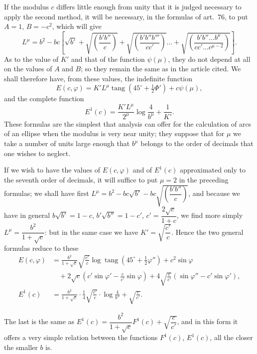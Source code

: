 \documentclass{article}
\begin{document}
If the modulus $c$ differs little enough from unity that it is judged necessary to apply the second method, it will be necessary, in the formulas of art.~76, to put $A=1$, $B=-c^{2}$, which will give
\[ L^{\mu}=b^{2}-bc\left[\sqrt{b'}+\sqrt{\left(\frac{b'b''}{c}\right)}+\sqrt{\left(\frac{b'b''b'''}{cc'}\right)}\ldots+\sqrt{\left(\frac{b'b''\ldots b^{\mu}}{cc'\ldots c^{\mu-2}}\right)}\right]. \]
As to the value of $K'$ and that of the function $\psi(\mu)$, they do not depend at all on the values of $A$ and $B$; so they remain the same as in the article cited. We shall therefore have, from these values, the indefinite function
\[ E(c,\varphi)=K'L^{\mu}\operatorname{tang}(45^{\circ}+\tfrac{1}{2}\Phi')+c\psi(\mu), \]
and the complete function
\[ E^{1}(c)=\frac{K'L^{\mu}}{2^{\mu}}\log\frac{4}{b^{\mu}}+\frac{1}{K'}. \]
These formulas are the simplest that analysis can offer for the calculation of arcs of an ellipse when the modulus is very near unity; they suppose that for $\mu$ we take a number of units large enough that $b^{\mu}$ belongs to the order of decimals that one wishes to neglect.

If we wish to have the values of $E(c,\varphi)$ and of $E^{1}(c)$ approximated only to the seventh order of decimals, it will suffice to put $\mu=2$ in the preceding formulas; we shall have first $L^{\mu}=b^{2}-bc\sqrt{b'}-bc\sqrt{\left(\dfrac{b'b''}{c}\right)}$, and because we have in general $b\sqrt{b'}=1-c$, $b'\sqrt{b''}=1-c'$, $c'=\dfrac{2\sqrt{c}}{1+c}$, we find more simply $L^{\mu}=\dfrac{b^{2}}{1+\sqrt{c}}$: but in the same case we have $K'=\sqrt{\dfrac{c'}{c}}$. Hence the two general formulas reduce to these
\[ \begin{aligned} E(c,\varphi)&=\frac{b^{2}}{1+\sqrt{c}}\sqrt{\frac{c'}{c}}\log\operatorname{tang}(45^{\circ}+\tfrac{1}{2}\varphi'')+c^{2}\sin\varphi\\ &\quad+2\sqrt{c}\left(c'\sin\varphi'-\frac{c}{c'}\sin\varphi\right)+4\sqrt{\frac{c}{c'}}(\sin\varphi''-c'\sin\varphi'),\\ E^{1}(c)&=\frac{b^{2}}{1+\sqrt{c}}\cdot\frac{1}{4}\sqrt{\frac{c'}{c}}\cdot\log\frac{4}{b''}+\sqrt{\frac{c}{c'}}. \end{aligned} \]

The last is the same as $E^{1}(c)=\dfrac{b^{2}}{1+\sqrt{c}}F^{1}(c)+\sqrt{\dfrac{c}{c'}}$, and in this form it offers a very simple relation between the functions $F^{1}(c)$, $E^{1}(c)$, all the closer the smaller $b$ is.
\end{document}
